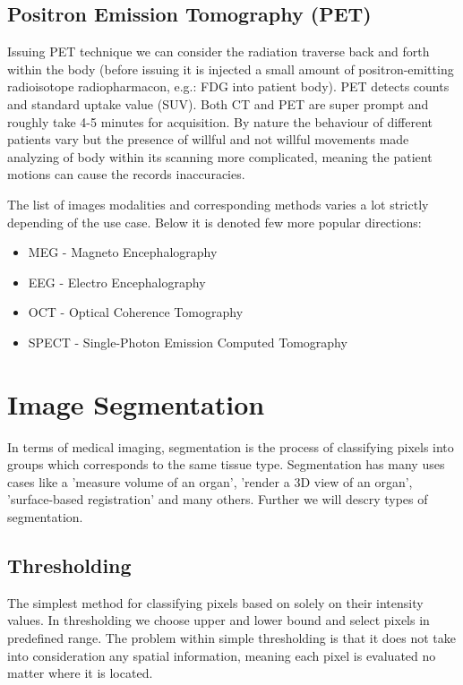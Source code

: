 \subsection{Positron Emission Tomography (PET)}
Issuing PET technique we can consider the radiation traverse back and forth within the body (before issuing it is injected a small amount of positron-emitting radioisotope radiopharmacon, e.g.: FDG into patient body). PET detects counts and standard uptake value (SUV). Both CT and PET are super prompt and roughly take 4-5 minutes for acquisition.  
By nature the behaviour of different patients vary but the presence of willful and not willful movements made analyzing of body within its scanning more complicated, meaning the patient motions can cause the records inaccuracies. 

The list of images modalities and corresponding methods varies a lot strictly depending of the use case.
Below it is denoted few more popular directions:
\begin{itemize}
    \item MEG - Magneto Encephalography
    \item EEG -  Electro Encephalography
    \item OCT -  Optical Coherence Tomography
    \item SPECT -  Single-Photon Emission Computed Tomography
\end{itemize}

\section{Image Segmentation}
In terms of medical imaging, segmentation is the process of classifying pixels into groups which corresponds to the same tissue type. Segmentation has many uses cases like a 'measure volume of an organ', 'render a 3D view of an organ', 'surface-based registration' and many others. Further we will descry types of segmentation. 

\subsection{Thresholding}
The simplest method for classifying pixels based on solely on their intensity values. In thresholding we choose upper and lower bound and select pixels in predefined range.
The problem within simple thresholding is that it does not take into consideration any spatial information, meaning each pixel is evaluated no matter where it is located.    

